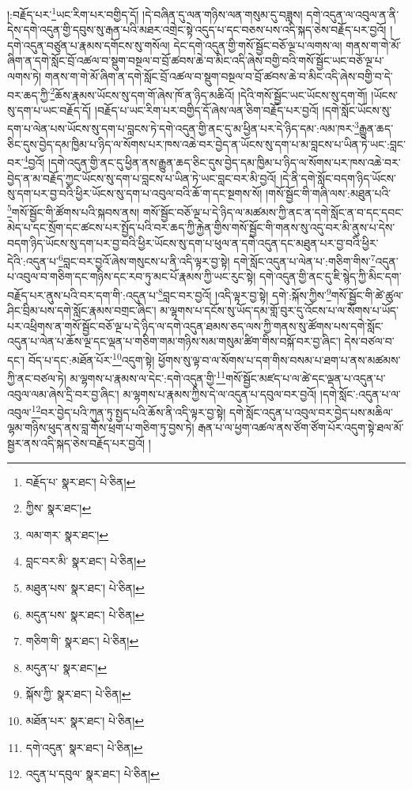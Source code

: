 །:བརྗོད་པར་\footnote{བརྗོད་པ་  སྣར་ཐང་།  པེ་ཅིན། }ཡང་རིག་པར་བགྱིད་དོ། །དེ་བཞིན་དུ་ལན་གཉིས་ལན་གསུམ་དུ་བཟླས། དགེ་འདུན་ལ་འབུལ་ན་ནི་དེས་དགེ་འདུན་གྱི་དབུས་སུ་རྒན་པའི་མཐར་འགྲེང་སྟེ་འདུད་པ་དང་བཅས་པས་འདི་སྐད་ཅེས་བརྗོད་པར་བྱའོ། །དགེ་འདུན་བཙུན་པ་རྣམས་དགོངས་སུ་གསོལ། དེང་དགེ་འདུན་གྱི་གསོ་སྦྱོང་བཅོ་ལྔ་པ་ལགས་ལ། གནས་ག་གེ་མོ་ཞིག་ན་དགེ་སློང་བྲོ་འཚལ་བ་སྡུག་བསྔལ་བ་བྲོ་ཚབས་ཆེ་བ་མིང་འདི་ཞེས་བགྱི་བའི་གསོ་སྦྱོང་ཡང་བཅོ་ལྔ་པ་ལགས་ཏེ། གནས་ག་གེ་མོ་ཞིག་ན་དགེ་སློང་བྲོ་འཚལ་བ་སྡུག་བསྔལ་བ་བྲོ་ཚབས་ཆེ་བ་མིང་འདི་ཞེས་བགྱི་བ་དེ་བར་ཆད་ཀྱི་\footnote{ཀྱིས་  སྣར་ཐང་། }ཆོས་རྣམས་ཡོངས་སུ་དག་གོ་ཞེས་ཁོ་ན་ཉིད་མཆིའོ། །དེའི་གསོ་སྦྱོང་ཡང་ཡོངས་སུ་དག་གོ། །ཡོངས་སུ་དག་པ་ཡང་བརྗོད་དོ། །བརྗོད་པ་ཡང་རིག་པར་བགྱིད་དོ་ཞེས་ལན་ཅིག་བརྗོད་པར་བྱའོ། །དགེ་སློང་ཡོངས་སུ་དག་པ་ལེན་པས་ཡོངས་སུ་དག་པ་བླངས་ཏེ་དགེ་འདུན་གྱི་ནང་དུ་མ་ཕྱིན་པར་དེ་ཉིད་དམ་:ལམ་ཁར་\footnote{ལམ་གར་  སྣར་ཐང་། }རྒྱུན་ཆད་ཅིང་དུས་བྱེད་དམ་ཁྱིམ་པ་ཉིད་ལ་སོགས་པར་ཁས་འཆེ་བར་བྱེད་ན་ཡོངས་སུ་དག་པ་མ་བླངས་པ་ཡིན་ཏེ་ཡང་:བླང་བར་\footnote{བླང་བར་མི་  སྣར་ཐང་།  པེ་ཅིན། }བྱའོ། །དགེ་འདུན་གྱི་ནང་དུ་ཕྱིན་ནས་རྒྱུན་ཆད་ཅིང་དུས་བྱེད་དམ་ཁྱིམ་པ་ཉིད་ལ་སོགས་པར་ཁས་འཆེ་བར་བྱེད་ན་མ་བརྗོད་ཀྱང་ཡོངས་སུ་དག་པ་བླངས་པ་ཡིན་ཏེ་ཡང་བླང་བར་མི་བྱའོ། །དེ་ནི་དགེ་སློང་བདག་ཉིད་ཡོངས་སུ་དག་པར་བྱ་བའི་ཕྱིར་ཡོངས་སུ་དག་པ་འབུལ་བའི་ཆོ་ག་དང་སྔགས་སོ། །གསོ་སྦྱོང་གི་གཞི་ལས་:མཐུན་པའི་\footnote{མཐུན་པས་  སྣར་ཐང་།  པེ་ཅིན། }གསོ་སྦྱོང་གི་ཚོགས་པའི་སྐབས་ནས། གསོ་སྦྱོང་བཅོ་ལྔ་པ་དེ་ཉིད་ལ་མཚམས་ཀྱི་ནང་ན་དགེ་སློང་ན་བ་དང་དབང་མེད་པ་དང་སྲོག་དང་ཚངས་པར་སྤྱོད་པའི་བར་ཆད་ཀྱི་རྐྱེན་གྱིས་གསོ་སྦྱོང་གི་གནས་སུ་འདུ་བར་མི་ནུས་པ་དེས་བདག་ཉིད་ཡོངས་སུ་དག་པར་བྱ་བའི་ཕྱིར་ཡོངས་སུ་དག་པ་ཕུལ་ན་དགེ་འདུན་དང་མཐུན་པར་བྱ་བའི་ཕྱིར་དེའི་:འདུན་པ་\footnote{མདུན་པས་  སྣར་ཐང་།  པེ་ཅིན། }བླང་བར་བྱའོ་ཞེས་གསུངས་པ་ནི་འདི་ལྟར་བྱ་སྟེ། དགེ་སློང་འདུན་པ་ལེན་པ་:གཅིག་གིས་\footnote{གཅིག་གི་  སྣར་ཐང་།  པེ་ཅིན། }འདུན་པ་འབུལ་བ་གཅིག་དང་གཉིས་དང་རབ་ཏུ་མང་པོ་རྣམས་ཀྱི་ཡང་རུང་སྟེ། དགེ་འདུན་གྱི་ནང་དུ་ཇི་སྙེད་ཀྱི་མིང་དག་བརྗོད་པར་ནུས་པའི་བར་དག་གི་:འདུན་པ་\footnote{མདུན་པ་  སྣར་ཐང་། }བླང་བར་བྱའོ། །འདི་ལྟར་བྱ་སྟེ། དགེ་:སྐོས་ཀྱིས་\footnote{སྐོས་ཀྱི་  སྣར་ཐང་།  པེ་ཅིན། }གསོ་སྦྱོང་གི་ཚེ་ཚུལ་ཤིང་བྲིམ་པས་དགེ་སློང་རྣམས་བགྲང་ཞིང་། མ་ལྷགས་པ་དངོས་སུ་ཡོད་དམ་གློ་བུར་དུ་འོངས་པ་ལ་སོགས་པ་ཡོད་པར་འཕྲིགས་ན་གསོ་སྦྱོང་བཅོ་ལྔ་པ་དེ་ཉིད་ལ་དགེ་འདུན་ཐམས་ཅད་ལས་ཀྱི་གནས་སུ་ཚོགས་པས་དགེ་སློང་འདུན་པ་ལེན་པ་ཆོས་ལྔ་དང་ལྡན་པ་གཅིག་གམ་གཉིས་སམ་གསུམ་ཚིག་གིས་བསྐོ་བར་བྱ་ཞིང་། དེས་བཙལ་བ་དང་། བོད་པ་དང་:མཐོན་པོར་\footnote{མཐོན་པར་  སྣར་ཐང་།  པེ་ཅིན། }འདུག་སྟེ། ཕྱོགས་སུ་ལྟ་བ་ལ་སོགས་པ་དག་གིས་བསམ་པ་ཐག་པ་ནས་མཚམས་ཀྱི་ནང་བཙལ་ཏེ། མ་ལྷགས་པ་རྣམས་ལ་དེང་:དགེ་འདུན་གྱི་\footnote{དགེ་འདུན་  སྣར་ཐང་།  པེ་ཅིན། }གསོ་སྦྱོང་མཛད་པ་ལ་ཚེ་དང་ལྡན་པ་འདུན་པ་འབུལ་ལམ་ཞེས་དྲི་བར་བྱ་ཞིང་། མ་ལྷགས་པ་རྣམས་ཀྱིས་དེ་ལ་འདུན་པ་དབུལ་བར་བྱའོ། །དགེ་སློང་:འདུན་པ་ལ་འབུལ་\footnote{འདུན་པ་དབུལ་  སྣར་ཐང་།  པེ་ཅིན། }བར་བྱེད་པའི་ཀུན་ཏུ་སྤྱད་པའི་ཆོས་ནི་འདི་ལྟར་བྱ་སྟེ། དགེ་སློང་འདུན་པ་འབུལ་བར་བྱེད་པས་མཆིལ་ལྷམ་གཉིས་ཕུད་ནས་བླ་གོས་ཕྲག་པ་གཅིག་ཏུ་བྱས་ཏེ། རྒན་པ་ལ་ཕྱག་འཚལ་ནས་ཙོག་ཙོག་པོར་འདུག་སྟེ་ཐལ་མོ་སྦྱར་ནས་འདི་སྐད་ཅེས་བརྗོད་པར་བྱའོ། །
